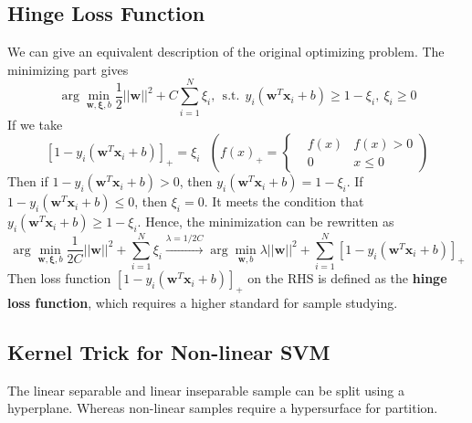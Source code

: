 \documentclass[12pt]{article}
\begin{document}
\subsection{Hinge Loss Function}
We can give an equivalent description of the original optimizing problem. The minimizing part gives
\begin{equation}
    \arg \min_{\bm{w},\bm{\xi},b} \frac{1}{2}||\bm{w}||^2 + C\sum_{i=1}^N \xi_i,~~\text{s.t.}~~y_i(\bm{w}^T \bm{x}_i + b) \geq 1 - \xi_i,~\xi_i \geq 0
\end{equation}
If we take 
\begin{equation}
    \left[1 - y_i(\bm{w}^T \bm{x}_i + b)\right]_+ = \xi_i~~~\left( f(x)_+ = \left\{ \begin{aligned} & f(x) &f(x) > 0 \\ &0 &x \leq 0 \end{aligned} \right. \right)
\end{equation}
Then if $1 - y_i(\bm{w}^T \bm{x}_i + b) > 0$, then $y_i(\bm{w}^T \bm{x}_i + b) = 1 - \xi_i$. If $1 - y_i(\bm{w}^T \bm{x}_i + b) \leq 0$, then $\xi_i = 0$. It meets the condition that $y_i(\bm{w}^T \bm{x}_i + b) \geq 1 - \xi_i $. Hence, the minimization can be rewritten as
\begin{equation}
    \arg \min_{\bm{w}, \bm{\xi}, b} \frac{1}{2C} ||\bm{w}||^2 + \sum_{i=1}^N \xi_i \stackrel{\lambda = 1/2C}{\longrightarrow} \arg \min_{\bm{w}, b} \lambda ||\bm{w}||^2 + \sum_{i=1}^N \left[1 - y_i(\bm{w}^T \bm{x}_i + b)\right]_+
\end{equation}
Then loss function $\left[1 - y_i(\bm{w}^T \bm{x}_i + b)\right]_+$ on the RHS is defined as the \textbf{hinge loss function}, which requires a higher standard for sample studying.
\subsection{Kernel Trick for Non-linear SVM}
The linear separable and linear inseparable sample can be split using a hyperplane. Whereas non-linear samples require a hypersurface for partition. 
\end{document}
